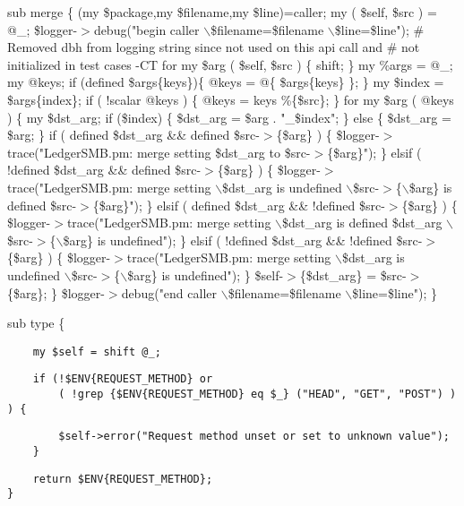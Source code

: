 sub merge \{
    (my \$package,my \$filename,my \$line)=caller;
    my ( \$self, \$src ) = @\_;
    \$logger-$>$debug("begin caller $\backslash$\$filename=\$filename $\backslash$\$line=\$line");
       \# Removed dbh from logging string since not used on this api call and
       \# not initialized in test cases -CT
    for my \$arg ( \$self, \$src ) \{
        shift;
    \}
    my \%args  = @\_;
    my @keys;
    if (defined \$args\{keys\})\{
         @keys  = @\{ \$args\{keys\} \};
    \}
    my \$index = \$args\{index\};
    if ( !scalar @keys ) \{
        @keys = keys \%\{\$src\};
    \}
    for my \$arg ( @keys ) \{
        my \$dst\_arg;
        if (\$index) \{
            \$dst\_arg = \$arg . "\_\$index";
        \}
        else \{
            \$dst\_arg = \$arg;
        \}
        if ( defined \$dst\_arg \&\& defined \$src-$>$\{\$arg\} )
        \{
            \$logger-$>$trace("LedgerSMB.pm: merge setting \$dst\_arg to \$src-$>$\{\$arg\}");
        \}
        elsif ( !defined \$dst\_arg \&\& defined \$src-$>$\{\$arg\} )
        \{
            \$logger-$>$trace("LedgerSMB.pm: merge setting $\backslash$\$dst\_arg is undefined $\backslash$\$src-$>$\{$\backslash$\$arg\} is defined \$src-$>$\{\$arg\}");
        \}
        elsif ( defined \$dst\_arg \&\& !defined \$src-$>$\{\$arg\} )
        \{
            \$logger-$>$trace("LedgerSMB.pm: merge setting $\backslash$\$dst\_arg is defined \$dst\_arg $\backslash$\$src-$>$\{$\backslash$\$arg\} is undefined");
        \}
        elsif ( !defined \$dst\_arg \&\& !defined \$src-$>$\{\$arg\} )
        \{
            \$logger-$>$trace("LedgerSMB.pm: merge setting $\backslash$\$dst\_arg is undefined $\backslash$\$src-$>$\{$\backslash$\$arg\} is undefined");
        \}
        \$self-$>$\{\$dst\_arg\} = \$src-$>$\{\$arg\};
    \}
    \$logger-$>$debug("end caller $\backslash$\$filename=\$filename $\backslash$\$line=\$line");
\}



sub type \{

\begin{verbatim}
    my $self = shift @_;
\end{verbatim}
\begin{verbatim}
    if (!$ENV{REQUEST_METHOD} or 
        ( !grep {$ENV{REQUEST_METHOD} eq $_} ("HEAD", "GET", "POST") ) ) {
\end{verbatim}
\begin{verbatim}
        $self->error("Request method unset or set to unknown value");
    }
\end{verbatim}
\begin{verbatim}
    return $ENV{REQUEST_METHOD};
}
\end{verbatim}


